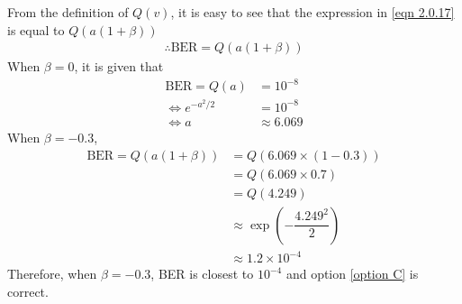 \documentclass[journal,10pt,twocolumn]{IEEEtran}
\begin{document}
From the definition of $Q(v)$, it is easy to see that the expression in \ref{eqn 2.0.17} is equal to $Q(a(1+\beta))$
\begin{align}
\therefore \text{BER} = Q(a(1+\beta ))
\end{align}
When $\beta = 0$, it is given that 
\begin{align}
\text{BER} = Q(a) &= 10^{-8} \\
\Leftrightarrow e^{-a^2 / 2} &= 10^{-8}\\
\Leftrightarrow a &\approx 6.069
\end{align}
When $\beta = -0.3$,
\begin{align}
\text{BER} = Q(a(1+\beta)) &= Q(6.069 \times (1-0.3))\\
&= Q(6.069 \times 0.7)\\
&= Q(4.249)\\
&\approx \exp (-\dfrac{4.249^2}{2})\\
&\approx 1.2 \times 10^{-4}
\end{align}
Therefore, when $\beta = -0.3$, BER is closest to $10^{-4}$ and option \ref{option C} is correct.
\end{document}

